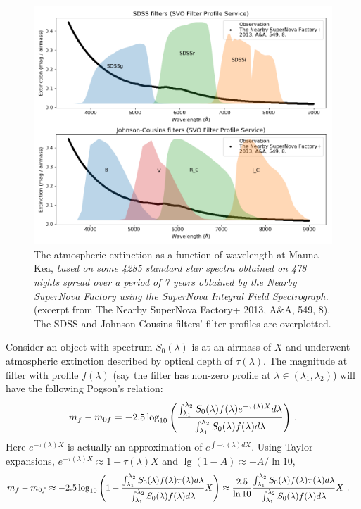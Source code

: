 \begin{figure}[ht!]
\centering
\includegraphics[width=0.9\linewidth]{figs/air-ext-and-filter}
\caption{The atmospheric extinction as a function of wavelength at Mauna Kea, \textit{based on some 4285 standard star spectra obtained on 478 nights spread over a period of 7 years obtained by the Nearby SuperNova Factory using the SuperNova Integral Field Spectrograph.} (excerpt from The Nearby SuperNova Factory+ 2013, A\&A, 549, 8). The SDSS and Johnson-Cousins filters' filter profiles are overplotted.}
\label{fig:air-ext-and-filter}
\end{figure}

Consider an object with spectrum $ S_0(\lambda) $ is at an airmass of $ X $ and underwent atmospheric extinction described by optical depth of $ \tau(\lambda) $. The magnitude at filter with profile $ f(\lambda) $ (say the filter has non-zero profile at $ \lambda \in (\lambda_1, \lambda_2) $) will have the following Pogson's relation:
\begin{equation}
  m_f - m_{0f}
    = -2.5 \log_{10}
      \qty( \frac{\int_{\lambda_1}^{\lambda_2} S_0(\lambda) f(\lambda) e^{-\tau(\lambda) X} d\lambda}
      {\int_{\lambda_1}^{\lambda_2} S_0(\lambda) f(\lambda) d\lambda} ) ~.
\end{equation}
Here $ e^{-\tau(\lambda) X} $ is actually an approximation of $ e^{\int -\tau(\lambda) dX} $. Using Taylor expansions, $ e^{-\tau(\lambda) X} \approx 1 - \tau(\lambda) X $ and $ \lg (1 - A) \approx - A / \ln 10 $, 
\begin{equation}
\begin{aligned}
    m_f - m_{0f} 
    &\approx -2.5 \log_{10} 
      \qty( 1 - \frac{\int_{\lambda_1}^{\lambda_2} S_0(\lambda) f(\lambda) \tau(\lambda) d\lambda}
        {\int_{\lambda_1}^{\lambda_2} S_0(\lambda) f(\lambda) d\lambda} X ) 
    \approx \frac{2.5}{\ln 10} 
      \frac{\int_{\lambda_1}^{\lambda_2} S_0(\lambda) f(\lambda) \tau(\lambda) d\lambda}
            {\int_{\lambda_1}^{\lambda_2} S_0(\lambda) f(\lambda) d\lambda} X ~.
\end{aligned}  
\end{equation}

